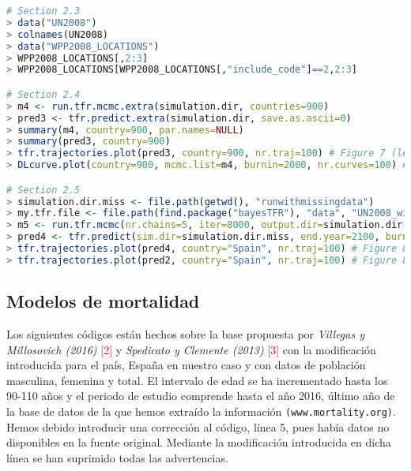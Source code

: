 \begin{lstlisting}[language=R, caption=C\'odigo R para modelo de simulaci\'on de fertilidad correspondiente a la sección 2.2]
# Section 2.3
> data("UN2008")
> colnames(UN2008)
> data("WPP2008_LOCATIONS")
> WPP2008_LOCATIONS[,2:3]
> WPP2008_LOCATIONS[WPP2008_LOCATIONS[,"include_code"]==2,2:3]

# Section 2.4
> m4 <- run.tfr.mcmc.extra(simulation.dir, countries=900)
> pred3 <- tfr.predict.extra(simulation.dir, save.as.ascii=0)
> summary(m4, country=900, par.names=NULL)
> summary(pred3, country=900)
> tfr.trajectories.plot(pred3, country=900, nr.traj=100) # Figure 7 (left)
> DLcurve.plot(country=900, mcmc.list=m4, burnin=2000, nr.curves=100) # Figure 7 (right)

# Section 2.5
> simulation.dir.miss <- file.path(getwd(), "runwithmissingdata")
> my.tfr.file <- file.path(find.package("bayesTFR"), "data", "UN2008_with_last_obs.txt")
> m5 <- run.tfr.mcmc(nr.chains=5, iter=8000, output.dir=simulation.dir.miss, my.tfr.file=my.tfr.file) # can take long time to run
> pred4 <- tfr.predict(sim.dir=simulation.dir.miss, end.year=2100, burnin=2000, nr.traj=3000, verbose=TRUE)
> tfr.trajectories.plot(pred4, country="Spain", nr.traj=100) # Figure 8 (left)
> tfr.trajectories.plot(pred2, country="Spain", nr.traj=100) # Figure 8 (right)
\end{lstlisting}

\subsection{Modelos de mortalidad}

Los siguientes c\'odigos  est\'an hechos sobre la base propuesta por \textit{Villegas y Millosovich (2016)} \textcolor{red}{[2]} y \textit{Spedicato y Clemente (2013)} \textcolor{red}{[3]} con la modificaci\'on introducida para el pa\'is, Espa\~na en nuestro caso y con datos de poblaci\'on masculina, femenina y total. El intervalo de edad se ha incrementado hasta los 90-110 a\~nos y el periodo de estudio comprende hasta el a\~no 2016, \'ultimo a\~no de la base de datos de la que hemos extra\'ido la informaci\'on \texttt{(www.mortality.org)}. Hemos debido introducir una correcci\'on al c\'odigo, l\'inea 5, pues hab\'ia datos no disponibles en la fuente original. Mediante la modificaci\'on introducida en dicha l\'inea se han suprimido todas las advertencias. 

